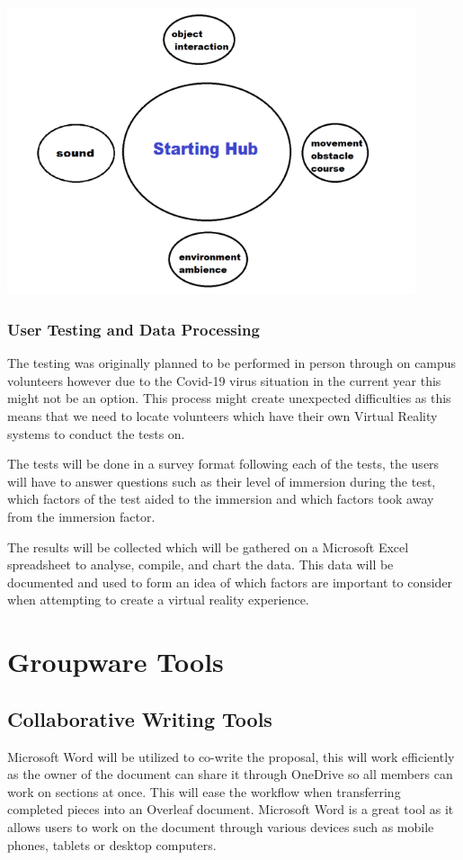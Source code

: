  \includegraphics[width=12cm]{Chapters/Picture2.png}

\subsection{User Testing and Data Processing}
The testing was originally planned to be performed in person through on campus volunteers however due to the Covid-19 virus situation in the current year this might not be an option. 
This process might create unexpected difficulties as this means that we need to locate volunteers which have their own Virtual Reality systems to conduct the tests on.  

The tests will be done in a survey format following each of the tests, the users will have to answer questions such as their level of immersion during the test, which factors of the test aided to the immersion and which factors took away from the immersion factor. 

The results will be collected which will be gathered on a Microsoft Excel spreadsheet to analyse, compile, and chart the data. This data will be documented and used to form an idea of which factors are important to consider when attempting to create a virtual reality experience. 

\chapter{Groupware Tools}

\section{Collaborative Writing Tools}
Microsoft Word will be utilized to co-write the proposal, this will work efficiently as the owner of the document can share it through OneDrive so all members can work on sections at once. This will ease the workflow when transferring completed pieces into an Overleaf document. Microsoft Word is a great tool as it allows users to work on the document through various devices such as mobile phones, tablets or desktop computers.  

